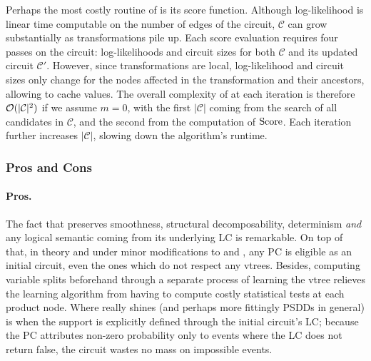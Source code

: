 Perhaps the most costly routine of  is its score function. Although
log-likelihood is linear time computable on the number of edges of the circuit, $\mathcal{C}$ can
grow substantially as transformations pile up. Each score evaluation requires four passes on the
circuit: log-likelihoods and circuit sizes for both $\mathcal{C}$ and its updated circuit
$\mathcal{C}'$. However, since transformations are local, log-likelihood and circuit sizes only
change for the nodes affected in the transformation and their ancestors, allowing
 to cache values. The overall complexity of  at each
iteration is therefore $\mathcal{O}(|\mathcal{C}|^2)$ if we assume $m=0$, with the first $|\mathcal{C}|$
coming from the search of all candidates in $\mathcal{C}$, and the second from the computation of
$\operatorname{\normalfont{Score}}$. Each iteration further increases $|\mathcal{C}|$, slowing down the algorithm's runtime.

\subsubsection{Pros and Cons}

\paragraph{Pros.} The fact that  preserves smoothness, structural
decomposability, determinism \emph{and} any logical semantic coming from its underlying LC is
remarkable. On top of that, in theory and under minor modifications to  and
, any PC is eligible as an initial circuit, even the ones which do not respect any
vtrees. Besides, computing variable splits beforehand through a separate process of learning the
vtree relieves the learning algorithm from having to compute costly statistical tests at each
product node. Where  really shines (and perhaps more fittingly PSDDs in
general) is when the support is explicitly defined through the initial circuit's LC; because the PC
attributes non-zero probability only to events where the LC does not return false, the circuit
wastes no mass on impossible events.

